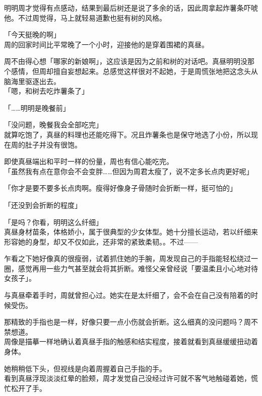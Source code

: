 明明周才觉得有点感动，结果到最后树还是说了多余的话，因此周拿起炸薯条吓唬他。不过周觉得，马上就轻易道歉也挺有树的风格。\\

\vspace{2\baselineskip}

「今天挺晚的啊」\\

周的回家时间比平常晚了一个小时，迎接他的是穿着围裙的真昼。

周不由得心想「哪家的新娘啊」，这应该是因为之前和树的对话吧。真昼明明没那个感情，但周却擅自妄想起来。总感觉这样很对不起她，于是周慌张地把这念头从脑海里驱逐出去。\\

「嗯，和树去吃炸薯条了」

「……明明是晚餐前」

「没问题，晚餐我会全部吃完」\\

就算吃饱了，真昼的料理也还能吃得下。况且炸薯条也是保守地选了小份，所以现在周的肚子并没有很饱。

即使真昼端出和平时一样的份量，周也有信心能吃完。\\

「虽然我有点在意你会不会变胖……但因为周君太瘦了，说不定多长点肉更好呢」

「你才是要不要多长点肉啊。瘦得好像身子骨随时会折断一样，挺可怕的」

「还没到会折断的程度」

「是吗？你看，明明这么纤细」\\

真昼身材苗条，体格娇小，属于很典型的少女体型。她十分擅长运动，若以纤细来形容她的身型，却又不仅如此，还非常的紧致柔韧。。不过——%

乍看之下她好像真的很瘦弱，试着抓住她的手腕，周发现自己的手指能轻松绕过一圈，感觉再用一些力气甚至就会将其折断。难怪父亲曾经说「要温柔且小心地对待女孩子」。

与真昼牵着手时，周就曾担心过。她实在是太纤细了，会不会在自己没有陪着的时候受伤。

那精致的手指也是一样，好像只要一点小伤就会折断。这么细真的没问题吗？周不禁想道。\\

周像是描摹一样地确认着真昼手指的触感和结实程度，接着就看到真昼缓缓扭动着身体。

她稍稍低下头，但视线是向着周握着自己手指的手。\\

看到真昼浮现淡淡红晕的脸颊，周才发觉自己没经过许可就不客气地触碰着她，慌忙松开了手。\\

